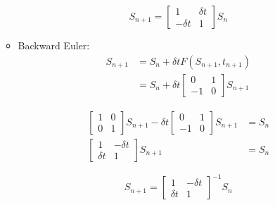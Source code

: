 \documentclass[a4paper,11pt]{report}
\begin{document}
\begin{enumerate}
\begin{itemize}
    \begin{equation*}
    S_{n+1} = \begin{bmatrix} 1 & \delta t \\ -\delta t & 1 \end{bmatrix} S_{n}
    \end{equation*}
    
    \vspace{1cm}

    \item Backward Euler:
    \begin{equation*}
    \begin{aligned}
    S_{n+1} &= S_{n} + \delta t F(S_{n+1}, t_{n+1}) \\
            &= S_{n} + \delta t \begin{bmatrix} 0 & 1 \\ -1 & 0 \end{bmatrix} S_{n+1}
    \end{aligned}
    \end{equation*}

    \begin{equation*}
    \begin{aligned}
    \begin{bmatrix} 1 & 0 \\ 0 & 1 \end{bmatrix} S_{n+1} - \delta t \begin{bmatrix} 0 & 1 \\ -1 & 0 \end{bmatrix} S_{n+1} &= S_{n} \\
    \begin{bmatrix} 1 & -\delta t \\ \delta t & 1 \end{bmatrix} S_{n+1} &= S_{n}
    \end{aligned} 
    \end{equation*}

    \begin{equation*}
    S_{n+1} = \begin{bmatrix} 1 & -\delta t \\ \delta t & 1 \end{bmatrix}^{-1} S_{n}
    \end{equation*}

    \vspace{1 cm}


\end{itemize}
\end{enumerate}
\end{document}
